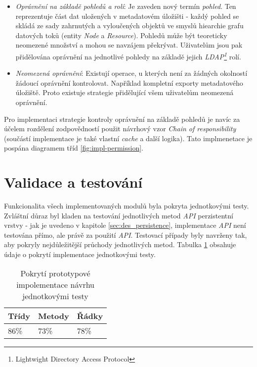 \begin{itemize}
   \item{\textit{Oprávnění na základě pohledů a rolí}}: Je zaveden nový termín \textit{pohled}. Ten reprezentuje část dat uložených v metadatovém úložišti - každý pohled se skládá ze sady zahrnutých a vyloučených objektů ve smyslů hiearchie grafu datových toků (entity \textit{Node} a \textit{Resource}). Pohledů může být teoreticky neomezené množství a mohou se navzájem překrývat. Uživatelům jsou pak přidělována oprávnění na jednotlivé pohledy na základě jejich \textit{LDAP\footnote{Lightwight Directory Access Protocol}} rolí.

   \item{\textit{Neomezená oprávnění}}: Existují operace, u kterých není za žádných okolností žádoucí oprávnění kontrolovat. Například kompletní exporty metadatového úložiště. Proto existuje strategie přidělující všem uživatelům neomezená oprávnění.
\end{itemize}

Pro implementaci strategie kontroly oprávnění na základě pohledů je navíc za účelem rozdělení zodpovědností použit návrhový vzor \textit{Chain of responsibility} (součástí implementace je také vlastní \textit{cache} a další logika). Tato implmenetace je pospána diagramem tříd \ref{fig:impl-permission}.


\section{Validace a testování}
Funkcionalita všech implementovaných modulů byla pokryta jednotkovými testy. Zvláštní důraz byl kladen na testování jednotlivých metod \textit{API} perzistentní vrstvy - jak je uvedeno v kapitole \ref{sec:des_persistence}, implementace \textit{API} není testována přímo, ale právě za použití \textit{API}. Testovací případy byly navrženy tak, aby pokryly nejdůležitější průchody jednotlivých metod. Tabulka \ref{tab:coverage} obsahuje údaje o pokrytí implementace jednotkovými testy.

\begin{table}[h!]
\begin{center}
\centering
\caption{Pokrytí prototypové impolementace návrhu jednotkovými testy}
\label{tab:coverage}
\begin{tabular}{|p{4cm}|p{4cm}|p{4cm}|}
	\hline
    Třídy & Metody & Řádky \\ \hline
	 86\% &	73\% &	78\% \\ \hline
 \end{tabular}
 \end{center}
 \end{table}

